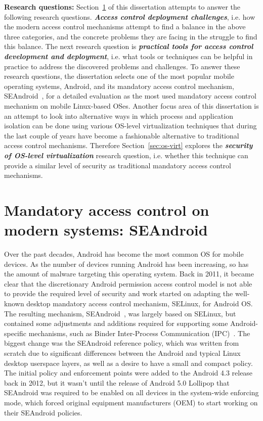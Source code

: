 \textbf{Research questions:}   Section~\ref{sec:seandroid} of this dissertation attempts to answer the following research questions. \textbf{\textit{Access control deployment challenges}}, i.e. how the modern access control mechanisms attempt to find a balance in the above three categories, and the concrete problems they are facing in the struggle to find this balance. The next research question is \textbf{\textit{practical tools for access control development and deployment}}, i.e. what tools or techniques can be helpful in practice to address the discovered problems and challenges. To answer these research questions, the dissertation selects one of the most popular mobile operating systems, Android, and its mandatory access control mechanism, SEAndroid~\cite{smalley12}, for a detailed evaluation as the most used mandatory access control mechanism on mobile Linux-based OSes. Another focus area of this dissertation is an attempt to look into alternative ways in which process and application isolation can be done using various OS-level virtualization  techniques that during the last couple of years have become a fashionable alternative to traditional access control mechanisms. Therefore Section~\ref{sec:os-virt} explores the \textit{\textbf{security of OS-level virtualization}} research question, i.e. whether this technique can provide a similar level of security as traditional mandatory access control mechanisms. 


\section{Mandatory access control on modern systems: SEAndroid}
\label{sec:seandroid}

Over the past decades, Android has become the most common OS for mobile devices. As the number of devices running Android has been increasing, so has the amount of malware targeting this operating system. Back in 2011, it became clear that the discretionary Android permission access control model is not able to provide the required level of security and work started on adapting the well-known desktop mandatory access control mechanism, SELinux, for Android OS. The resulting mechanism, SEAndroid~\cite{smalley12}, was largely based on SELinux, but contained some adjustments and additions required for supporting some Android-specific mechanisms, such as Binder Inter-Process Communication (IPC)~\cite{binder}. The biggest change was the SEAndroid reference policy, which was written from scratch due to significant differences between the Android and typical Linux desktop userspace layers, as well as a desire to have a small and compact policy. The initial policy and enforcement points were added to the Android 4.3 release back in 2012, but it wasn't until the release of Android 5.0 Lollipop that SEAndroid was required to be enabled on all devices in the system-wide enforcing mode, which forced original equipment manufacturers (OEM) to start working on their SEAndroid policies. 

